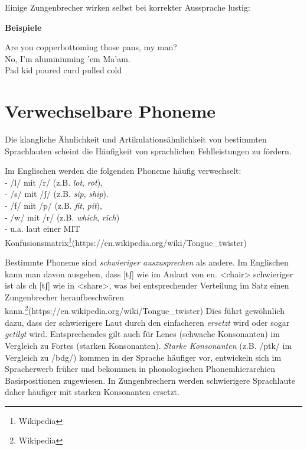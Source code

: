\documentclass[
  letterpaper,
]{scrbook}
\begin{document}
Einige Zungenbrecher wirken selbst bei korrekter Aussprache lustig:\\

\begin{tcolorbox}[enhanced jigsaw, rightrule=.15mm, arc=.35mm, breakable, colframe=quarto-callout-note-color-frame, left=2mm, colback=white, bottomrule=.15mm, toprule=.15mm, leftrule=.75mm, opacityback=0]
\begin{minipage}[t]{5.5mm}
\textcolor{quarto-callout-note-color}{\faInfo}
\end{minipage}%
\begin{minipage}[t]{\textwidth - 5.5mm}

\textbf{Beispiele}\vspace{2mm}

Are you copperbottoming those pans, my man?\\
No, I'm aluminiuming 'em Ma'am.\\
Pad kid poured curd pulled cold

\end{minipage}%
\end{tcolorbox}

\hypertarget{verwechselbare-phoneme}{%
\section{Verwechselbare Phoneme}\label{verwechselbare-phoneme}}

Die klangliche Ähnlichkeit und Artikulationsähnlichkeit von bestimmten
Sprachlauten scheint die Häufigkeit von sprachlichen Fehlleistungen zu
fördern.

Im Englischen werden die folgenden Phoneme häufig verwechselt:\\
- /l/ mit /r/ (z.B. \emph{lot}, \emph{rot}),\\
- /s/ mit /ʃ/ (z.B. \emph{sip}, \emph{ship}).\\
- /f/ mit /p/ (z.B. \emph{fit}, \emph{pit}),\\
- /w/ mit /r/ (z.B. \emph{which}, \emph{rich})\\
- u.a. laut einer MIT
Konfusionsmatrix\footnote{Wikipedia}(https://en.wikipedia.org/wiki/Tongue\_twister)

Bestimmte Phoneme sind \emph{schwieriger auszusprechen} als andere. Im
Englischen kann man davon ausgehen, dass {[}tʃ{]} wie im Anlaut von en.
\textless chair\textgreater{} schwieriger ist als ch {[}tʃ{]} wie in
\textless share\textgreater, was bei entsprechender Verteilung im Satz
einen Zungenbrecher heraufbeschwören
kann.\footnote{Wikipedia}(https://en.wikipedia.org/wiki/Tongue\_twister)
Dies führt gewöhnlich dazu, dass der schwierigere Laut durch den
einfacheren \emph{ersetzt} wird oder sogar \emph{getilgt} wird.
Entsprechendes gilt auch für Lenes (schwache Konsonanten) im Vergleich
zu Fortes (starken Konsonanten). \emph{Starke Konsonanten} (z.B. /ptk/
im Vergleich zu /bdg/) kommen in der Sprache häufiger vor, entwickeln
sich im Spracherwerb früher und bekommen in phonologischen
Phonemhierarchien Basispositionen zugewiesen. In Zungenbrechern werden
schwierigere Sprachlaute daher häufiger mit starken Konsonanten ersetzt.
\end{document}
